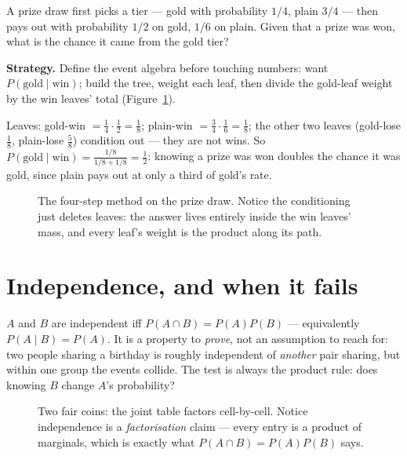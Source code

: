 \begin{example}\label{ex:cond}
A prize draw first picks a tier --- gold with probability $1/4$,
plain $3/4$ --- then pays out with probability $1/2$ on gold, $1/6$ on
plain. Given that a prize was won, what is the chance it came from the
gold tier?
\par\smallskip
\textbf{Strategy.} Define the event algebra before touching numbers:
want $P(\text{gold} \mid \text{win})$; build the tree, weight each
leaf, then divide the gold-leaf weight by the win leaves' total
(Figure~\ref{fig:ptree}).
\par\smallskip
\begin{solution}
Leaves: gold-win $= \frac14\cdot\frac12 = \frac18$;
plain-win $= \frac34\cdot\frac16 = \frac18$; the other two leaves
(gold-lose $\frac18$, plain-lose $\frac58$) condition out --- they are
not wins. So $P(\text{gold}\mid\text{win}) = \frac{1/8}{1/8+1/8}
= \frac{1}{2}$: knowing a prize was won doubles the chance it was
gold, since plain pays out at only a third of gold's rate.
\end{solution}
\end{example}

\begin{figure}[ht]\centering

\caption{The four-step method on the prize draw. Notice the
conditioning just deletes leaves: the answer lives entirely inside the
win leaves' mass, and every leaf's weight is the product along its
path.}
\label{fig:ptree}
\end{figure}

\section{Independence, and when it fails}\label{sec:indep}
$A$ and $B$ are independent iff $P(A\cap B) = P(A)P(B)$ ---
equivalently $P(A\mid B) = P(A)$. It is a property to \emph{prove},
not an assumption to reach for: two people sharing a birthday is
roughly independent of \emph{another} pair sharing, but within one
group the events collide. The test is always the product rule: does
knowing $B$ change $A$'s probability?

\begin{figure}[ht]\centering

\caption{Two fair coins: the joint table factors cell-by-cell. Notice
independence is a \emph{factorisation} claim --- every entry is a
product of marginals, which is exactly what $P(A\cap B) = P(A)P(B)$
says.}
\label{fig:indepgrid}
\end{figure}

